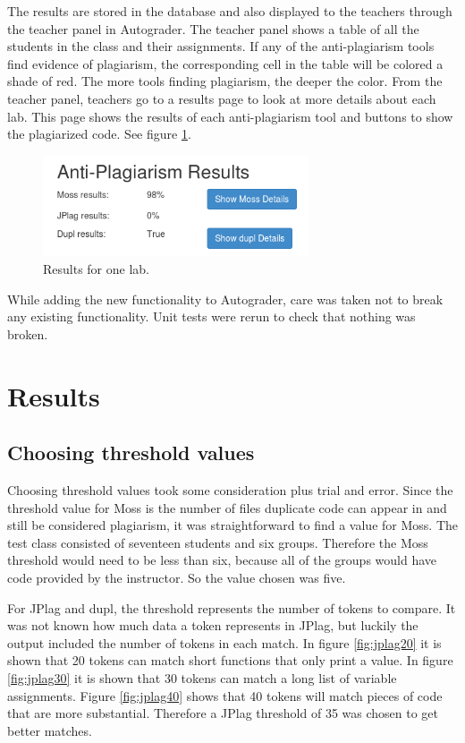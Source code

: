 \documentclass[10pt,journal,compsoc]{IEEEtran}
\begin{document}
		The results are stored in the database and also displayed to the teachers through the teacher panel in Autograder. The teacher panel shows a table of all the students in the class and their assignments. If any of the anti-plagiarism tools find evidence of plagiarism, the corresponding cell in the table will be colored a shade of red. The more tools finding plagiarism, the deeper the color. From the teacher panel, teachers go to a results page to look at more details about each lab. This page shows the results of each anti-plagiarism tool and buttons to show the plagiarized code. See figure \ref{fig:labresults}.
		
		\begin{figure}[h!]
			\includegraphics[width=0.7\textwidth]{LabResults.png}
			\caption{Results for one lab.}
			\label{fig:labresults}
		\end{figure}
		
		While adding the new functionality to Autograder, care was taken not to break any existing functionality. Unit tests were rerun to check that nothing was broken.
		
	\section{Results}
	
		\subsection{Choosing threshold values}
		Choosing threshold values took some consideration plus trial and error. Since the threshold value for Moss is the number of files duplicate code can appear in and still be considered plagiarism, it was straightforward to find a value for Moss. The test class consisted of seventeen students and six groups. Therefore the Moss threshold would need to be less than six, because all of the groups would have code provided by the instructor. So the value chosen was five.
		
		For JPlag and dupl, the threshold represents the number of tokens to compare. It was not known how much data a token represents in JPlag, but luckily the output included the number of tokens in each match. In figure \ref{fig:jplag20} it is shown that 20 tokens can match short functions that only print a value. In figure \ref{fig:jplag30} it is shown that 30 tokens can match a long list of variable assignments. Figure \ref{fig:jplag40} shows that 40 tokens will match pieces of code that are more substantial. Therefore a JPlag threshold of 35 was chosen to get better matches.
		
\end{document}
